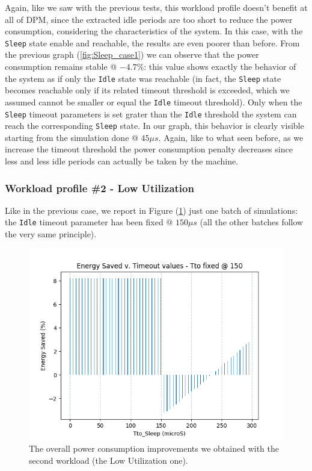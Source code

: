 \documentclass[a4paper]{article}
\begin{document}
            Again, like we saw with the previous tests, this workload profile doesn't benefit at all of DPM, since the extracted idle periods are too short to reduce the power consumption, considering the characteristics of the system. In this case, with the \texttt{Sleep} state enable and reachable, the results are even poorer than before.
            From the previous graph (\ref{fig:Sleep_case1}) we can observe that the power consumption remains stable @ $-4.7\%$: this value shows exactly the behavior of the system as if only the \texttt{Idle} state was reachable (in fact, the \texttt{Sleep} state becomes reachable only if its related timeout threshold is exceeded, which we assumed cannot be smaller or equal the \texttt{Idle} timeout threshold).
            Only when the \texttt{Sleep} timeout parameters is set grater than the \texttt{Idle} threshold the system can reach the corresponding \texttt{Sleep} state. In our graph, this behavior is clearly visible starting from the simulation done @ $45 \mu s$.
            Again, like to what seen before, as we increase the timeout threshold the power consumption penalty decreases since less and less idle periods can actually be taken by the machine.

        \subsubsection{Workload profile \#2 - Low Utilization}
        Like in the previous case, we report in Figure (\ref{fig:Sleep_case2}) just one batch of simulations: the \texttt{Idle} timeout parameter has been fixed @ $150 \mu s$ (all the other batches follow the very same principle).

        \begin{figure}[htp]
            \centering
            \includegraphics[width=0.6 \columnwidth]{./screenshots/Sleep_case2.png}
            \caption{
                    \label{fig:Sleep_case2}
                    The overall power consumption improvements we obtained with the second workload (the Low Utilization one).
            }
        \end{figure}
\end{document}
